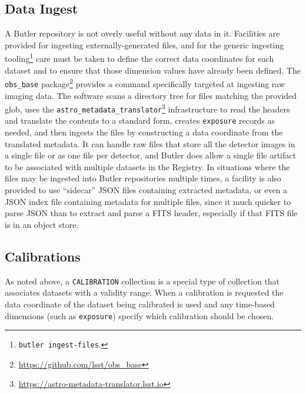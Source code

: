 \documentclass[]{spie}
\begin{document}
\subsection{Data Ingest}

A Butler repository is not overly useful without any data in it.
Facilities are provided for ingesting externally-generated files, and for the generic ingesting tooling\footnote{\texttt{butler ingest-files}.} care must be taken to define the correct data coordinates for each dataset and to ensure that those dimension values have already been defined.
The \texttt{obs\_base} package\footnote{\url{https://github.com/lsst/obs_base}} provides a command specifically targeted at ingesting raw imaging data.
The software scans a directory tree for files matching the provided glob, uses the \texttt{astro\_metadata\_translator}\footnote{\url{https://astro-metadata-translator.lsst.io}} infrastructure to read the headers and translate the contents to a standard form, creates \texttt{exposure} records as needed, and then ingests the files by constructing a data coordinate from the translated metadata.
It can handle raw files that store all the detector images in a single file or as one file per detector, and Butler does allow a single file artifact to be associated with multiple datasets in the Registry.
In situations where the files may be ingested into Butler repositories multiple times, a facility is also provided to use ``sidecar'' JSON files containing extracted metadata, or even a JSON index file containing metadata for multiple files, since it much quicker to parse JSON than to extract and parse a FITS header, especially if that FITS file is in an object store.

\subsection{Calibrations}

As noted above, a \texttt{CALIBRATION} collection is a special type of collection that associates datasets with a validity range.
When a calibration is requested the data coordinate of the dataset being calibrated is used and any time-based dimensions (such as \texttt{exposure}) specify which calibration should be chosen.
\end{document}
